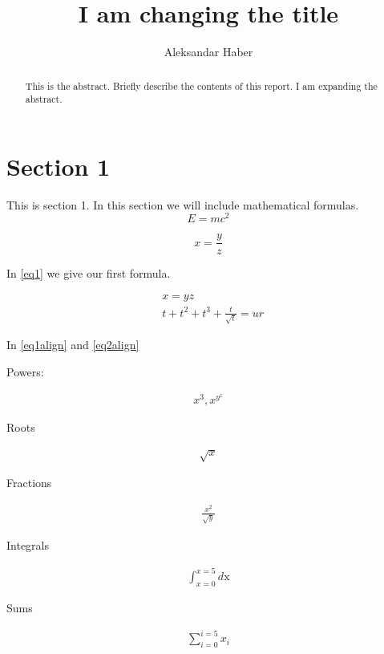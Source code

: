 \documentclass[a4paper]{article}
\title{\textbf{I am changing the title}}
\author{Aleksandar Haber}
\begin{document}
																			\maketitle
\begin{abstract}
This is the abstract. Briefly describe the contents of this report. I am expanding the abstract.
\end{abstract}

\section{Section 1}


This is section 1. In this section we will include mathematical formulas. 
\begin{equation}
E=mc^2
\label{eq2}
\end{equation}

\begin{equation}
x=\frac{y}{z}
\label{eq1}
\end{equation}

In \eqref{eq1} we give our first formula. 


\begin{align}
 & x = yz  \label{eq1align}  \\
 &  t +t^2+t^3+\frac{t}{\sqrt{t}} =ur  \label{eq2align}
\end{align}

In \eqref{eq1align} and \eqref{eq2align}

Powers:

\begin{align}
x^{3},  x^{y^{z}}
\end{align}

Roots

\begin{align}
\sqrt{x}
\end{align}

Fractions

\begin{align}
\frac{x^{2}}{\sqrt{y}}
\end{align}

Integrals

\begin{align}
\int_{x=0}^{x=5}   d\text{x}
\end{align}

Sums 

\begin{align}
\sum_{i=0}^{i=5} x_{i}
\end{align}
\end{document}
